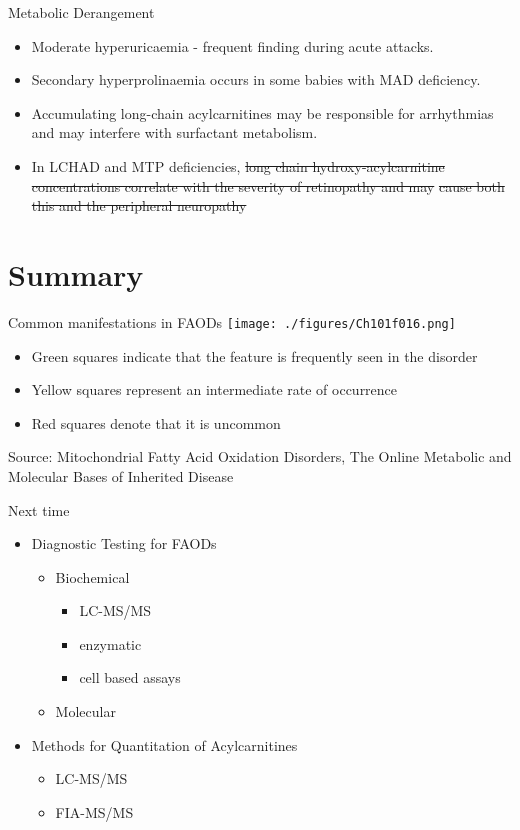 \documentclass[presentation, smaller]{beamer}
\begin{document}
\begin{frame}[label={sec:orgheadline47}]{Metabolic Derangement}
\begin{itemize}
\item Moderate hyperuricaemia - frequent finding during acute attacks.
\item Secondary hyperprolinaemia occurs in some babies with MAD deficiency.
\item Accumulating long-chain acylcarnitines may be responsible for
arrhythmias and may interfere with surfactant metabolism.
\item In LCHAD and MTP deficiencies, \sout{long chain hydroxy-acylcarnitine}
  \sout{concentrations correlate with the severity of retinopathy and may}
  \sout{cause both this and the peripheral neuropathy}
\end{itemize}
\end{frame}

\section{Summary}
\label{sec:orgheadline51}
\begin{frame}[label={sec:orgheadline49}]{Common manifestations in FAODs}
\texttt{[image: ./figures/Ch101f016.png]}

\begin{itemize}
\item Green squares indicate that the feature is frequently seen in the disorder
\item Yellow squares represent an intermediate rate of occurrence
\item Red squares denote that it is uncommon
\end{itemize}
\tiny{Source: Mitochondrial Fatty Acid Oxidation Disorders, The Online Metabolic and Molecular Bases of Inherited Disease}
\end{frame}
\begin{frame}[label={sec:orgheadline50}]{Next time}
\begin{itemize}
\item Diagnostic Testing for FAODs
\begin{itemize}
\item Biochemical
\begin{itemize}
\item LC-MS/MS
\item enzymatic
\item cell based assays
\end{itemize}
\item Molecular
\end{itemize}

\item Methods for Quantitation of Acylcarnitines
\begin{itemize}
\item LC-MS/MS
\item FIA-MS/MS
\end{itemize}
\end{itemize}
\end{frame}
\end{document}
